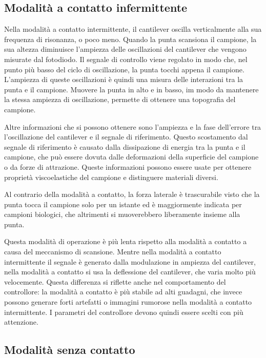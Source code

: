\documentclass[../main.tex]{subfiles}
\begin{document}
\subsection{Modalità a contatto infermittente} \label{s:afm_ic}

Nella modalità a contatto intermittente, il cantilever oscilla verticalmente alla sua frequenza di risonanza, o poco meno. Quando la punta scansiona il campione, la sua altezza diminuisce l'ampiezza delle oscillazioni del cantilever che vengono misurate dal fotodiodo. Il segnale di controllo viene regolato in modo che, nel punto più basso del ciclo di oscillazione, la punta tocchi appena il campione. L'ampiezza di queste oscillazioni è quindi una misura delle interazioni tra la punta e il campione. Muovere la punta in alto e in basso, im modo da mantenere la stessa ampiezza di oscillazione, permette di ottenere una topografia del campione.

Altre informazioni che si possono ottenere sono l'ampiezza e la fase dell'errore tra l'oscillazione del cantilever e il segnale di riferimento. Questo scostamento dal segnale di riferimento è causato dalla dissipazione di energia tra la punta e il campione, che può essere dovuta dalle deformazioni della superficie del campione o da forze di attrazione. Queste informazioni possono essere usate per ottenere proprietà viscoelastiche del campione e distinguere materiali diversi.\cite{bruker_phase_imaging}

Al contrario della modalità a contatto, la forza laterale è trascurabile visto che la punta tocca il campione solo per un istante ed è maggiormente indicata per campioni biologici, che altrimenti si muoverebbero liberamente insieme alla punta.\cite{karrasch_1993}

Questa modalità di operazione è più lenta rispetto alla modalità a contatto a causa del meccanismo di scansione. Mentre nella modalità a contatto intermittente il segnale è generato dalla modulazione in ampiezza del cantilever, nella modalità a contatto si usa la deflessione del cantilever, che varia molto più velocemente. Questa differenza si riflette anche nel comportamento del controllore: la modalità a contatto è più stabile ad alti guadagni, che invece possono generare forti artefatti o immagini rumorose nella modalità a contatto intermittente. I parametri del controllore devono quindi essere scelti con più attenzione. 

\subsection{Modalità senza contatto} \label{s:afm_nc}
\end{document}
